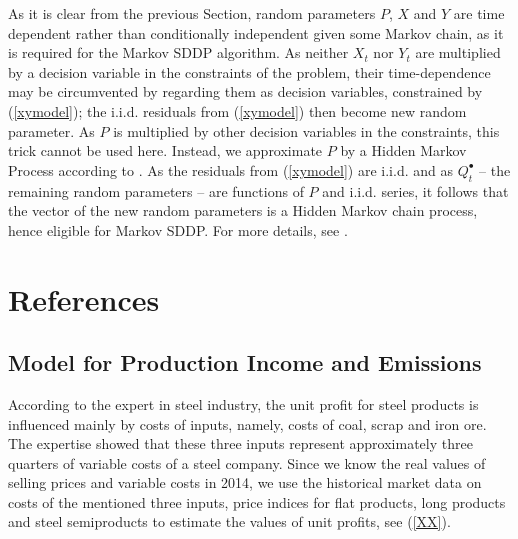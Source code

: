 \documentclass[3p,times]{elsarticle}
\begin{document}
As it is clear from the previous Section, random parameters $P$, $X$ and $Y$ are time dependent rather than conditionally independent given some Markov chain, as it is required for the Markov SDDP algorithm. As neither $X_t$ nor  $Y_t$ are multiplied by a decision variable in the constraints of the problem, their time-dependence may be circumvented by regarding them as decision variables, constrained by (\ref{xymodel}); the i.i.d. residuals from (\ref{xymodel}) then become new random parameter. As $P$ is multiplied by other decision variables in the constraints, this trick cannot be used here. Instead, we approximate $P$ by a Hidden Markov Process according to  \citep{smid2019solution}. As the residuals from (\ref{xymodel}) are i.i.d. and as  $Q^\bullet_t$ -- the remaining random parameters -- are functions of $P$ and i.i.d. series, it follows that the vector of the new random parameters is a Hidden Markov chain process, hence eligible for Markov SDDP. For more details, see \citet{smid2019solution}.




\section*{References}



\appendix

\def\indep{\perp\hspace{-2mm}\perp}
\def\E{\mathbb{E}}
\def\var{\mathrm{var}}
\newtheorem{lemma}{Lemma}

\subsection{Model for Production Income and Emissions}

According to the expert in steel industry, the unit profit for steel products is influenced mainly by costs of inputs, namely, costs of coal, scrap and iron ore. The expertise showed that these three inputs represent approximately three quarters of variable costs of a steel company. Since we know the real values of selling prices and variable costs in 2014, we use the historical market data on costs of the mentioned three inputs, price indices for flat products, long products and steel semiproducts to estimate the values of unit profits, see (\ref{XX}).
\end{document}
